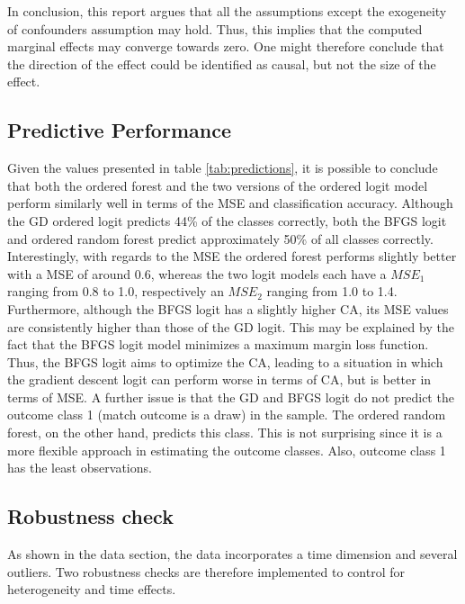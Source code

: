 \documentclass[11pt]{article}
\begin{document}
In conclusion, this report argues that all the assumptions except the exogeneity of confounders assumption may hold. Thus, this implies that the computed marginal effects may converge towards zero. One might therefore conclude that the direction of the effect could be identified as causal, but not the size of the effect.


\subsection{Predictive Performance}

Given the values presented in table \ref{tab:predictions}, it is possible to conclude that both the ordered forest and the two versions of the ordered logit model perform similarly well in terms of the MSE and classification accuracy.  Although the GD ordered logit predicts 44\% of the classes correctly, both the BFGS logit and ordered random forest predict approximately 50\% of all classes correctly. Interestingly, with regards to the MSE the ordered forest performs slightly better with a MSE of around 0.6, whereas the two logit models each have a $MSE_1$ ranging from 0.8 to 1.0, respectively an $MSE_2$ ranging from 1.0 to 1.4. Furthermore, although the BFGS logit has a slightly higher CA, its MSE values are consistently higher than those of the GD logit. This may be explained by the fact that the BFGS logit model minimizes a maximum margin loss function. Thus, the BFGS logit aims to optimize the CA, leading to a situation in which the gradient descent logit can perform worse in terms of CA, but is better in terms of MSE. A further issue is that the GD and BFGS logit do not predict the outcome class 1 (match outcome is a draw) in the sample. The ordered random forest, on the other hand, predicts this class. This is not surprising since it is a more flexible approach in estimating the outcome classes. Also, outcome class 1 has the least observations.



\subsection{Robustness check}

As shown in the data section, the data incorporates a time dimension and several outliers. Two robustness checks are therefore implemented to control for heterogeneity and time effects.
\end{document}
